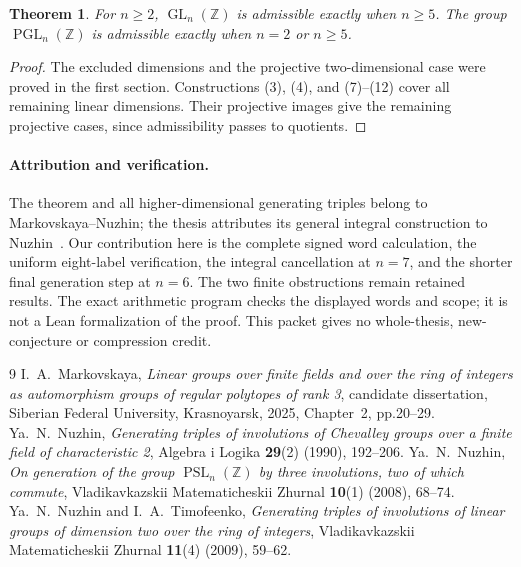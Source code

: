 \documentclass[11pt,a4paper]{article}
\newtheorem{theorem}{Theorem}\newtheorem{lemma}[theorem]{Lemma}
\newcommand{\GL}{\operatorname{GL}}\newcommand{\SL}{\operatorname{SL}}
\newcommand{\PGL}{\operatorname{PGL}}\newcommand{\PSL}{\operatorname{PSL}}
\begin{document}
\begin{theorem}
For $n\ge2$, $\GL_n(\mathbb Z)$ is admissible exactly when $n\ge5$.
The group $\PGL_n(\mathbb Z)$ is admissible exactly when $n=2$ or
$n\ge5$.
\end{theorem}
\begin{proof}
The excluded dimensions and the projective two-dimensional case were
proved in the first section. Constructions (3), (4), and (7)--(12)
cover all remaining linear dimensions. Their projective images give
the remaining projective cases, since admissibility passes to quotients.
\end{proof}

\paragraph{Attribution and verification.}
The theorem and all higher-dimensional generating triples belong to
Markovskaya--Nuzhin; the thesis attributes its general integral
construction to Nuzhin~\cite{N08}. Our contribution here is the complete
signed word calculation, the uniform eight-label verification, the
integral cancellation at $n=7$, and the shorter final generation step
at $n=6$. The two finite obstructions remain retained results.
The exact arithmetic program checks the displayed words and scope;
it is not a Lean formalization of the proof. This packet gives no
whole-thesis, new-conjecture or compression credit.

\begin{thebibliography}{9}
 I.~A.~Markovskaya, \emph{Linear groups over finite fields
and over the ring of integers as automorphism groups of regular
polytopes of rank 3}, candidate dissertation, Siberian Federal
University, Krasnoyarsk, 2025, Chapter~2, pp.20--29.
 Ya.~N.~Nuzhin, \emph{Generating triples of involutions
of Chevalley groups over a finite field of characteristic 2},
Algebra i Logika \textbf{29}(2) (1990), 192--206.
 Ya.~N.~Nuzhin, \emph{On generation of the group
$\PSL_n(\mathbb Z)$ by three involutions, two of which commute},
Vladikavkazskii Matematicheskii Zhurnal \textbf{10}(1) (2008), 68--74.
 Ya.~N.~Nuzhin and I.~A.~Timofeenko,
\emph{Generating triples of involutions of linear groups of dimension
two over the ring of integers}, Vladikavkazskii Matematicheskii
Zhurnal \textbf{11}(4) (2009), 59--62.
\end{thebibliography}
\end{document}
